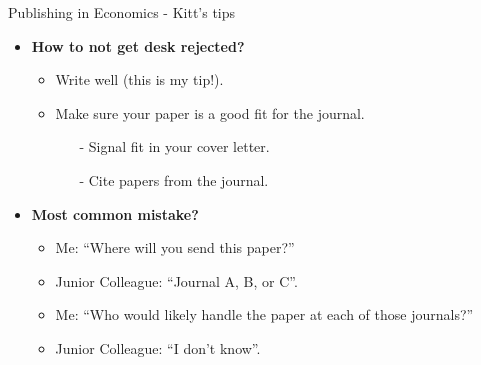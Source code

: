 \documentclass{beamer}
\begin{document}
\begin{frame}{Publishing in Economics - Kitt's tips}
    \begin{itemize}
        \item \textbf{How to not get desk rejected?}
        \begin{itemize}
            \item Write well (this is my tip!).
            \item Make sure your paper is a good fit for the journal.
            \begin{itemize}
                \item[-] Signal fit in your cover letter.
                \item[-] Cite papers from the journal.
            \end{itemize}
        \end{itemize}
        \medskip
        \pause \item \textbf{Most common mistake?}
        \begin{itemize}
            \item Me: “Where will you send this paper?”  
            \item Junior Colleague: “Journal A, B, or C”.  
            \item Me: “Who would likely handle the paper at each of those journals?”  
            \item Junior Colleague: “I don’t know”. 
        \end{itemize}
    \end{itemize}
\end{frame}
\end{document}
